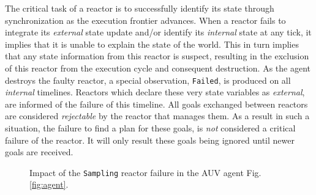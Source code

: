 The critical task of a \rx reactor is to successfully identify its
state through synchronization as the execution frontier advances. When
a reactor fails to integrate its {\em external} state update and/or
identify its {\em internal} state at any tick, it implies that it is
unable to explain the state of the world.  This in turn implies that
any state information from this reactor is suspect, resulting in the
exclusion of this reactor from the execution cycle and consequent
destruction. As the agent destroys the faulty reactor, a special
observation, \texttt{Failed}, is produced on all {\em internal}
timelines. Reactors which declare these very state variables as {\em
  external}, are informed of the failure of this timeline.  All goals
exchanged between reactors  are
 considered \emph{rejectable} by the reactor that
manages them. As a result in such a situation, the failure to find a
plan for these goals, is \emph{not} considered a critical failure of
the reactor. It will only result  these goals being
ignored until newer goals are received.


\begin{figure}[b]
  \centering {}
  \qquad
  \caption{\small Impact of the \texttt{Sampling} reactor failure in
    the AUV agent  Fig. \ref{fig:agent}.}
\end{figure}

